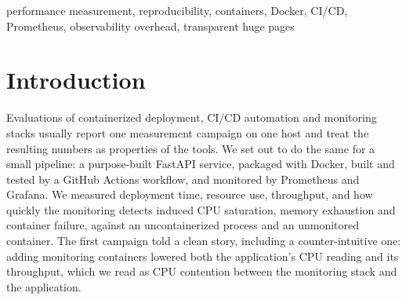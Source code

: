 \documentclass[conference]{IEEEtran}
\begin{document}
\begin{IEEEkeywords}
performance measurement, reproducibility, containers, Docker, CI/CD, Prometheus, observability overhead, transparent huge pages
\end{IEEEkeywords}

\section{Introduction}

Evaluations of containerized deployment, CI/CD automation and monitoring stacks
usually report one measurement campaign on one host and treat the resulting numbers
as properties of the tools. We set out to do the same for a small pipeline: a
purpose-built FastAPI service, packaged with Docker, built and tested by a GitHub
Actions workflow, and monitored by Prometheus and Grafana. We measured deployment
time, resource use, throughput, and how quickly the monitoring detects induced CPU
saturation, memory exhaustion and container failure, against an uncontainerized
process and an unmonitored container. The first campaign told a clean story,
including a counter-intuitive one: adding monitoring containers lowered both the
application's CPU reading and its throughput, which we read as CPU contention
between the monitoring stack and the application.
\end{document}
